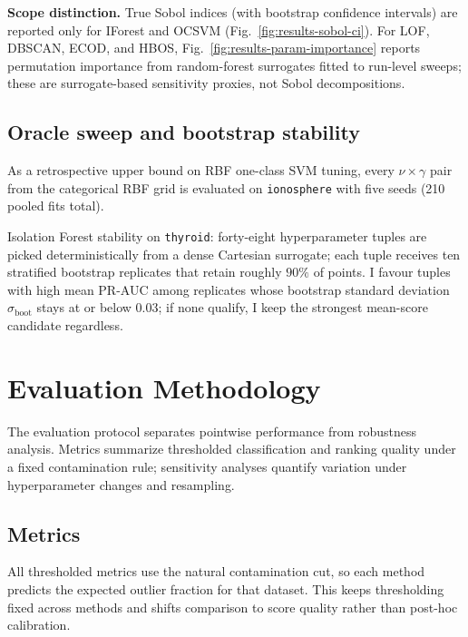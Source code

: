 \documentclass[cameraready]{Interspeech}
\begin{document}
\noindent\textbf{Scope distinction.} True Sobol indices (with bootstrap confidence intervals) are reported only for IForest and OCSVM (Fig.~\ref{fig:results-sobol-ci}). For LOF, DBSCAN, ECOD, and HBOS, Fig.~\ref{fig:results-param-importance} reports permutation importance from random-forest surrogates fitted to run-level sweeps; these are surrogate-based sensitivity proxies, not Sobol decompositions.

\subsection{Oracle sweep and bootstrap stability}

As a retrospective upper bound on RBF one-class SVM tuning, every \(\nu{\times}\gamma\) pair from the categorical RBF grid is evaluated on \texttt{ionosphere} with five seeds (210 pooled fits total).

Isolation Forest stability on \texttt{thyroid}: forty-eight hyperparameter tuples are picked deterministically from a dense Cartesian surrogate; each tuple receives ten stratified bootstrap replicates that retain roughly \(90\%\) of points. I favour tuples with high mean PR-AUC among replicates whose bootstrap standard deviation \(\sigma_{\mathrm{boot}}\) stays at or below \(0.03\); if none qualify, I keep the strongest mean-score candidate regardless.

\section{Evaluation Methodology}
\label{sec:evaluation}

The evaluation protocol separates pointwise performance from robustness analysis. Metrics summarize thresholded classification and ranking quality under a fixed contamination rule; sensitivity analyses quantify variation under hyperparameter changes and resampling.

\subsection{Metrics}

All thresholded metrics use the natural contamination cut, so each method predicts the expected outlier fraction for that dataset. This keeps thresholding fixed across methods and shifts comparison to score quality rather than post-hoc calibration.
\end{document}
